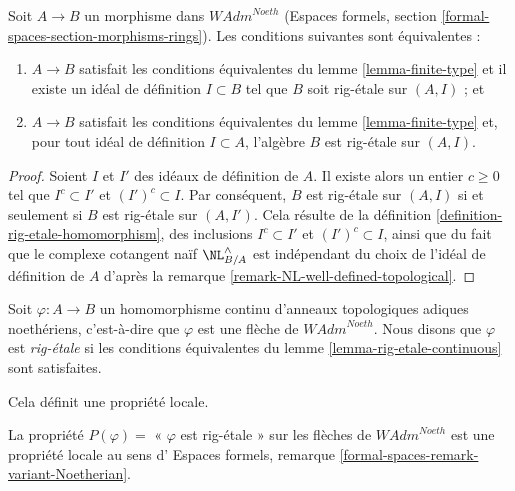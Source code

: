 \begin{lemma}
\label{lemma-rig-etale-continuous}
Soit $A \to B$ un morphisme dans $\textit{WAdm}^{Noeth}$
(Espaces formels, section \ref{formal-spaces-section-morphisms-rings}).
Les conditions suivantes sont équivalentes :
\begin{enumerate}
\item[(a)] $A \to B$ satisfait les conditions équivalentes du
lemme \ref{lemma-finite-type} et il existe un idéal de définition
$I \subset B$ tel que $B$ soit rig-étale sur $(A, I)$ ; et
\item[(b)] $A \to B$ satisfait les conditions équivalentes du
lemme \ref{lemma-finite-type} et, pour tout idéal de définition
$I \subset A$, l'algèbre $B$ est rig-étale sur $(A, I)$.
\end{enumerate}
\end{lemma}

\begin{proof}
Soient $I$ et $I'$ des idéaux de définition de $A$. Il existe alors un
entier $c \geq 0$ tel que $I^c \subset I'$ et $(I')^c \subset I$. Par conséquent,
$B$ est rig-étale sur $(A, I)$ si et seulement si
$B$ est rig-étale sur $(A, I')$. Cela résulte de la
définition \ref{definition-rig-etale-homomorphism},
des inclusions $I^c \subset I'$ et $(I')^c \subset I$, ainsi que
du fait que le complexe cotangent naïf $\NL_{B/A}^\wedge$
est indépendant du choix de l'idéal de définition de $A$ d'après la
remarque \ref{remark-NL-well-defined-topological}.
\end{proof}

\begin{definition}
\label{definition-rig-etale-continuous-homomorphism}
Soit $\varphi : A \to B$ un homomorphisme continu d'anneaux
topologiques adiques noethériens, c'est-à-dire que $\varphi$
est une flèche de $\textit{WAdm}^{Noeth}$. Nous disons que
$\varphi$ est {\it rig-étale} si les conditions équivalentes
du lemme \ref{lemma-rig-etale-continuous} sont satisfaites.
\end{definition}

\noindent
Cela définit une propriété locale.

\begin{lemma}
\label{lemma-rig-etale-axioms}
La propriété $P(\varphi)=$ « $\varphi$ est rig-étale » sur les flèches
de $\textit{WAdm}^{Noeth}$ est une propriété locale au sens d'
Espaces formels, remarque \ref{formal-spaces-remark-variant-Noetherian}.
\end{lemma}

